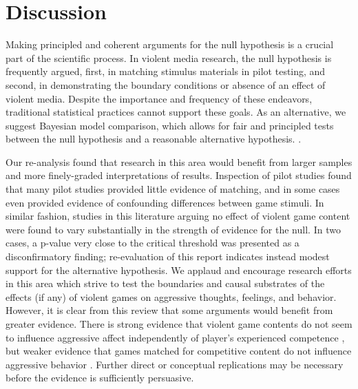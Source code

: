 \documentclass[fignum,nobf,man]{apa}
\begin{document}
\section{Discussion} %
Making principled and coherent arguments for the null hypothesis is a crucial part of the scientific process. In violent media research, the null hypothesis is frequently argued, first, in matching stimulus materials in pilot testing, and second, in demonstrating the boundary conditions or absence of an effect of violent media. Despite the importance and frequency of these endeavors, traditional statistical practices cannot support these goals. %
As an alternative, we suggest Bayesian model comparison, which allows for fair and principled tests between the null hypothesis and a reasonable alternative hypothesis. %
. %

Our re-analysis found that research in this area would benefit from larger samples and more finely-graded interpretations of results. Inspection of pilot studies found that many pilot studies provided little evidence of matching, and in some cases even provided evidence of confounding differences between game stimuli. In similar fashion, studies in this literature arguing no effect of violent game content were found to vary substantially in the strength of evidence for the null. In two cases, %
a p-value very close to the critical threshold was presented as a disconfirmatory finding; re-evaluation of this report indicates instead modest support for the alternative hypothesis. We applaud and encourage research efforts in this area which strive to test the boundaries and causal substrates of the effects (if any) of violent games on aggressive thoughts, feelings, and behavior. However, it is clear from this review that some arguments would benefit from greater evidence. There is strong evidence that violent game contents do not seem to influence aggressive affect independently of player's experienced competence \citep{Przybylski:etal:2014}, but weaker evidence that games matched for competitive content do not influence aggressive behavior \citep{Adachi:Willoughby:2011}. Further direct or conceptual replications may be necessary before the evidence is sufficiently persuasive. 
\end{document}
